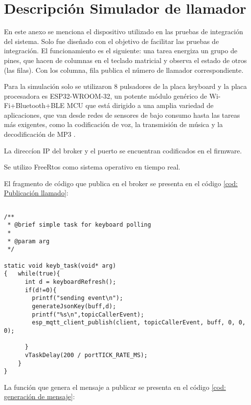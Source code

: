 
\chapter{Descripción Simulador de llamador} %

\label{AppendixA} %

En este anexo se menciona el dispositivo utilizado en las pruebas de integración del sistema. Solo fue diseñado con el objetivo de facilitar las pruebas de integración. El funcionamiento es el siguiente: una tarea energiza un grupo de pines, que hacen de columnas en el teclado matricial y observa el estado de otros (las filas). Con los columna, fila publica el número de llamador correspondiente. 

Para la simulación solo se utilizaron 8 pulsadores de la placa keyboard  \citep{WEBSITE:37} y la placa procesadora es ESP32-WROOM-32, un potente módulo genérico de Wi-Fi+Bluetooth+BLE MCU que está dirigido a una amplia variedad de aplicaciones, que van desde redes de sensores de bajo consumo hasta las tareas más exigentes, como la codificación de voz, la transmisión de música y la decodificación de MP3 \citep{WEBSITE:38}. 

La direccíon IP del broker y el puerto se encuentran codificados en el firmware.

Se utilizo FreeRtos \citep{WEBSITE:40} como sistema operativo en tiempo real.

El fragmento de código que publica en el broker se presenta en el código \ref{cod: Publicación llamado}:

\begin{lstlisting}[label=cod: Publicación llamado,caption=Tarea que publica en el broker la simulación de llamada]

/**
 * @brief simple task for keyboard polling
 * 
 * @param arg 
 */

static void keyb_task(void* arg)
{   while(true){
      int d = keyboardRefresh();
      if(d!=0){
        printf("sending event\n");
        generateJsonKey(buff,d);
        printf("%s\n",topicCallerEvent);
        esp_mqtt_client_publish(client, topicCallerEvent, buff, 0, 0, 0);

      }
      vTaskDelay(200 / portTICK_RATE_MS);
    }
}
\end{lstlisting}

La función que genera el mensaje a publicar se presenta en el código \ref{cod: generación de mensaje}:

